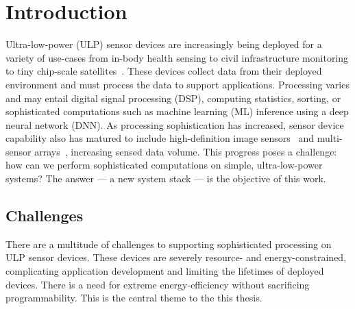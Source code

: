 \chapter{Introduction}
\label{chapter:intro}
Ultra-low-power (ULP) sensor devices are increasingly being deployed for a variety of use-cases from in-body health sensing to civil infrastructure monitoring to tiny chip-scale satellites~\cite{kicksat}.
% 
These devices collect data from their deployed environment and must process the 
data to support applications.
% 
Processing varies and may entail digital signal
processing (DSP), computing statistics, sorting, or sophisticated computations
such as machine learning (ML) inference using a deep neural network (DNN).
% 
As processing sophistication has increased, sensor device capability also
has matured to include high-definition image sensors~\cite{naderiparizi2018towards} and multi-sensor arrays~\cite{laput2017synthetic}, increasing sensed data volume.
%
This progress poses a challenge: how can we perform sophisticated computations
on simple, ultra-low-power systems?
% 
The answer --- a new system stack --- is the objective of this work.


\section{Challenges}
There are a multitude of challenges to supporting sophisticated processing on ULP sensor devices.
% 
These devices are severely resource- and energy-constrained, complicating application development and limiting the lifetimes of deployed devices.
% 
There is a need for extreme energy-efficiency without sacrificing programmability.
% 
This is the central theme to the this thesis.

